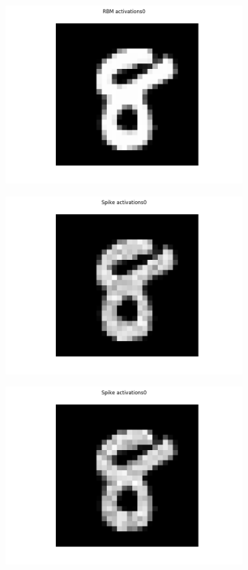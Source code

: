 \begin{figure}
	\centering
	\begin{subfigure}[t]{.24\textwidth}
  		\centering
  		\includegraphics[width=.9\linewidth]{imgs/convert/rbm00000.png}
  		\label{fig:sub1}
	\end{subfigure}%
	\begin{subfigure}[t]{.24\textwidth}
  		\centering
  		\includegraphics[width=.9\linewidth]{imgs/convert/cnn00000.png}
  		\label{fig:sub2}
	\end{subfigure}
	\begin{subfigure}[t]{.24\textwidth}
  		\centering
  		\includegraphics[width=.9\linewidth]{imgs/convert/coba00000.png}

\end{subfigure}
\end{figure}
